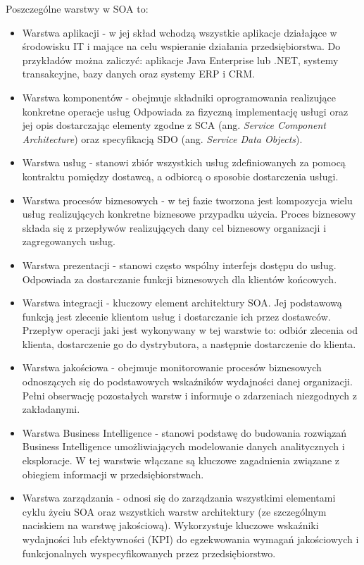Poszczególne warstwy w SOA to:
\begin{itemize}
\item{Warstwa aplikacji - w jej skład wchodzą wszystkie aplikacje działające w środowisku IT i mające na celu wspieranie działania przedsiębiorstwa. Do przykładów można zaliczyć: aplikacje Java Enterprise lub .NET, systemy transakcyjne, bazy danych oraz systemy ERP i CRM.}
\item{Warstwa komponentów - obejmuje składniki oprogramowania realizujące konkretne operacje usług Odpowiada za fizyczną implementację usługi oraz jej opis dostarczając elementy zgodne z SCA (ang. \textit{Service Component Architecture}) oraz specyfikacją SDO (ang. \textit{Service Data Objects}).}
\item{Warstwa usług - stanowi zbiór wszystkich usług zdefiniowanych za pomocą kontraktu pomiędzy dostawcą, a odbiorcą o sposobie dostarczenia usługi.}
\item{Warstwa procesów biznesowych - w tej fazie tworzona jest kompozycja wielu usług realizujących konkretne biznesowe przypadku użycia. Proces biznesowy składa się z przepływów realizujących dany cel biznesowy organizacji i zagregowanych usług.}
\item{Warstwa prezentacji - stanowi często wspólny interfejs dostępu do usług. Odpowiada za dostarczanie funkcji biznesowych dla klientów końcowych.}
\item{Warstwa integracji - kluczowy element architektury SOA. Jej podstawową funkcją jest zlecenie klientom usług i dostarczanie ich przez dostawców. Przepływ operacji jaki jest wykonywany w tej warstwie to: odbiór zlecenia od klienta, dostarczenie go do dystrybutora, a następnie dostarczenie do klienta.}
\item{Warstwa jakościowa - obejmuje monitorowanie procesów biznesowych odnoszących się do podstawowych wskaźników wydajności danej organizacji. Pełni obserwację pozostałych warstw i informuje o zdarzeniach niezgodnych z zakładanymi.}
\item{Warstwa Business Intelligence - stanowi podstawę do budowania rozwiązań Business Intelligence umożliwiających modelowanie danych analitycznych i eksploracje. W tej warstwie włączane są kluczowe zagadnienia związane z obiegiem informacji w przedsiębiorstwach.}
\item{Warstwa zarządzania - odnosi się do zarządzania wszystkimi elementami cyklu życiu SOA oraz wszystkich warstw architektury (ze szczególnym naciskiem na warstwę jakościową). Wykorzystuje kluczowe wskaźniki wydajności lub efektywności (KPI) do egzekwowania wymagań jakościowych i funkcjonalnych wyspecyfikowanych przez przedsiębiorstwo.}
\end{itemize}
\cite{PlatIntGor}

